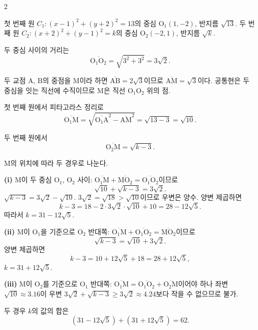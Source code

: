 \documentclass[10pt,fleqn]{article}
\renewcommand{\solpart}[1]{%
  \par\addvspace{10pt}\noindent
  {\sffamily\bfseries\color{black}(#1)}\hspace{3mm}\ignorespaces%
}
\begin{document}
\begin{multicols}{2}

첫 번째 원 $C_{1}: (x - 1)^{2} + (y + 2)^{2} = 13$의 중심 $\mathrm{O}_{1}(1, -2)$, 반지름 $\sqrt{13}$. 두 번째 원 $C_{2}: (x + 2)^{2} + (y - 1)^{2} = k$의 중심 $\mathrm{O}_{2}(-2, 1)$, 반지름 $\sqrt{k}$.

두 중심 사이의 거리는
\[ \overline{\mathrm{O}_{1}\mathrm{O}_{2}} = \sqrt{3^{2} + 3^{2}} = 3\sqrt{2}. \]

두 교점 $\mathrm{A}$, $\mathrm{B}$의 중점을 $\mathrm{M}$이라 하면 $\overline{\mathrm{AB}} = 2\sqrt{3}$이므로 $\overline{\mathrm{AM}} = \sqrt{3}$이다. 공통현은 두 중심을 잇는 직선에 수직이므로 $\mathrm{M}$은 직선 $\mathrm{O}_{1}\mathrm{O}_{2}$ 위의 점.

첫 번째 원에서 피타고라스 정리로
\[ \overline{\mathrm{O}_{1}\mathrm{M}} = \sqrt{\overline{\mathrm{O}_{1}\mathrm{A}}^{2} - \overline{\mathrm{AM}}^{2}} = \sqrt{13 - 3} = \sqrt{10}. \]

두 번째 원에서
\[ \overline{\mathrm{O}_{2}\mathrm{M}} = \sqrt{k - 3}. \]

$\mathrm{M}$의 위치에 따라 두 경우로 나눈다.

\solpart{i} $\mathrm{M}$이 두 중심 $\mathrm{O}_{1}$, $\mathrm{O}_{2}$ 사이: $\overline{\mathrm{O}_{1}\mathrm{M}} + \overline{\mathrm{MO}_{2}} = \overline{\mathrm{O}_{1}\mathrm{O}_{2}}$이므로
\[ \sqrt{10} + \sqrt{k - 3} = 3\sqrt{2}. \]
$\sqrt{k - 3} = 3\sqrt{2} - \sqrt{10}$. $3\sqrt{2} = \sqrt{18} > \sqrt{10}$이므로 우변은 양수. 양변 제곱하면
\[ k - 3 = 18 - 2 \cdot 3\sqrt{2} \cdot \sqrt{10} + 10 = 28 - 12\sqrt{5}. \]
따라서 $k = 31 - 12\sqrt{5}$.

\solpart{ii} $\mathrm{M}$이 $\mathrm{O}_{1}$을 기준으로 $\mathrm{O}_{2}$ 반대쪽: $\overline{\mathrm{O}_{1}\mathrm{M}} + \overline{\mathrm{O}_{1}\mathrm{O}_{2}} = \overline{\mathrm{MO}_{2}}$이므로
\[ \sqrt{k - 3} = \sqrt{10} + 3\sqrt{2}. \]
양변 제곱하면
\[ k - 3 = 10 + 12\sqrt{5} + 18 = 28 + 12\sqrt{5}, \]
$k = 31 + 12\sqrt{5}$.

\solpart{iii} $\mathrm{M}$이 $\mathrm{O}_{2}$를 기준으로 $\mathrm{O}_{1}$ 반대쪽: $\overline{\mathrm{O}_{1}\mathrm{M}} = \overline{\mathrm{O}_{1}\mathrm{O}_{2}} + \overline{\mathrm{O}_{2}\mathrm{M}}$이어야 하나 좌변 $\sqrt{10} \approx 3.16$이 우변 $3\sqrt{2} + \sqrt{k-3} \ge 3\sqrt{2} \approx 4.24$보다 작을 수 없으므로 불가.

두 경우 $k$의 값의 합은
\[ (31 - 12\sqrt{5}) + (31 + 12\sqrt{5}) = 62. \]


\end{multicols}
\end{document}
